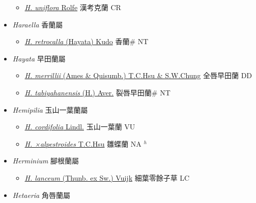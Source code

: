 \begin{itemize}
  \begin{itemize}
        \item[] \href{http://www.theplantlist.org/tpl1.1/search?q=Hancockia+uniflora}{\textit{H. uniflora} Rolfe}   漢考克蘭 CR
  \end{itemize}
 \item[] \textit{Haraella} 香蘭屬
                    
  \begin{itemize}
        \item[] \href{http://www.theplantlist.org/tpl1.1/search?q=Haraella+retrocalla}{\textit{H. retrocalla} (Hayata) Kudo}   香蘭\# NT
  \end{itemize}
 \item[] \textit{Hayata} 早田蘭屬
                    
  \begin{itemize}
        \item[] \href{http://www.theplantlist.org/tpl1.1/search?q=Hayata+merrillii}{\textit{H. merrillii} (Ames \& Quisumb.) T.C.Hsu \& S.W.Chung}   全唇早田蘭 DD
        \item[] \href{http://www.theplantlist.org/tpl1.1/search?q=Hayata+tabiyahanensis}{\textit{H. tabiyahanensis} (H.) Aver.}   裂唇早田蘭\# NT
  \end{itemize}
 \item[] \textit{Hemipilia} 玉山一葉蘭屬
                    
  \begin{itemize}
        \item[] \href{http://www.theplantlist.org/tpl1.1/search?q=Hemipilia+cordifolia}{\textit{H. cordifolia} Lindl.}   玉山一葉蘭 VU
        \item[] \href{http://www.theplantlist.org/tpl1.1/search?q=Hemipilia+×alpestroides}{\textit{H. ×alpestroides} T.C.Hsu}   雛蝶蘭 NA $^h$
  \end{itemize}
 \item[] \textit{Herminium} 腳根蘭屬
                    
  \begin{itemize}
        \item[] \href{http://www.theplantlist.org/tpl1.1/search?q=Herminium+lanceum}{\textit{H. lanceum} (Thunb. ex Sw.) Vuijk}   細葉零餘子草 LC
  \end{itemize}
 \item[] \textit{Hetaeria} 角唇蘭屬
                    

\end{itemize}
